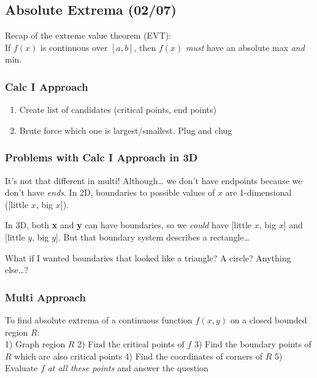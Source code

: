 \documentclass[
  letterpaper,
  DIV=11,
  numbers=noendperiod]{scrartcl}
\providecommand{\tightlist}{%
  \setlength{\itemsep}{0pt}\setlength{\parskip}{0pt}}\usepackage{longtable,booktabs,array}
\begin{document}
\newpage{}

\subsection{Absolute Extrema (02/07)}\label{absolute-extrema-0207}

Recap of the extreme value theorem (EVT):\\
If \(f(x)\) is continuous over \([a, b]\), then \(f(x)\) \emph{must}
have an absolute max \emph{and} min.

\subsubsection{Calc I Approach}\label{calc-i-approach}

\begin{enumerate}
\def\labelenumi{\arabic{enumi})}
\tightlist
\item
  Create list of candidates (critical points, end points)
\item
  Brute force which one is largest/smallest. Plug and chug
\end{enumerate}

\subsubsection{Problems with Calc I Approach in
3D}\label{problems-with-calc-i-approach-in-3d}

It's not that different in multi! Although\ldots{} we don't have
endpoints because we don't have \emph{ends}. In 2D, boundaries to
possible values of \(x\) are 1-dimensional ({[}little \(x\), big
\(x\){]}).

In 3D, both \textbf{x} and \textbf{y} can have boundaries, so we
\emph{could} have {[}little \(x\), big \(x\){]} and {[}little \(y\), big
\(y\){]}. But that boundary system describes a rectangle\ldots{}

What if I wanted boundaries that looked like a triangle? A circle?
Anything else\ldots?

\subsubsection{Multi Approach}\label{multi-approach}

To find absolute extrema of a continuous function \(f(x,y)\) on a closed
bounded region \(R\):\\
1) Graph region \(R\) 2) Find the critical points of \(f\) 3) Find the
boundary points of \(R\) which are also critical points 4) Find the
coordinates of corners of \(R\) 5) Evaluate \(f\) \emph{at all these
points} and answer the question
\end{document}
